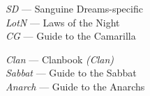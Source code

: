 \begin{minipage}{0.5\textwidth}
   \begin{flushleft}
	\emph{SD} --- Sanguine Dreams-specific \\
	\emph{LotN} --- Laws of the Night \\
	\emph{CG} --- Guide to the Camarilla \\
	\end{flushleft}
\end{minipage}
\begin{minipage}{0.5\textwidth}
   \begin{flushleft}
	\emph{Clan} --- Clanbook \emph{(Clan)} \\
	\emph{Sabbat} --- Guide to the Sabbat \\
	\emph{Anarch} --- Guide to the Anarchs \\
	\end{flushleft}
\end{minipage}

